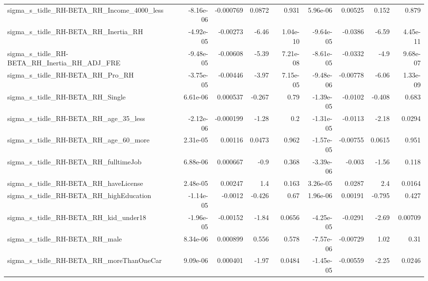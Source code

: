 \begin{tabular}{lrrrrrrrr}
sigma\_s\_tidle\_RH-BETA\_RH\_Income\_4000\_less          &   -8.16e-06 &    -0.000769 &   0.0872 &    0.931 &   5.96e-06 &     0.00525 &        0.152 &         0.879 \\
sigma\_s\_tidle\_RH-BETA\_RH\_Inertia\_RH                &   -4.92e-05 &     -0.00273 &    -6.46 & 1.04e-10 &  -9.64e-05 &     -0.0386 &        -6.59 &      4.45e-11 \\
sigma\_s\_tidle\_RH-BETA\_RH\_Inertia\_RH\_ADJ\_FRE        &   -9.48e-05 &     -0.00608 &    -5.39 & 7.21e-08 &  -8.61e-05 &     -0.0332 &         -4.9 &      9.68e-07 \\
sigma\_s\_tidle\_RH-BETA\_RH\_Pro\_RH                    &   -3.75e-05 &     -0.00446 &    -3.97 & 7.15e-05 &  -9.48e-06 &    -0.00778 &        -6.06 &      1.33e-09 \\
sigma\_s\_tidle\_RH-BETA\_RH\_Single                    &    6.61e-06 &     0.000537 &   -0.267 &     0.79 &  -1.39e-05 &     -0.0102 &       -0.408 &         0.683 \\
sigma\_s\_tidle\_RH-BETA\_RH\_age\_35\_less               &   -2.12e-06 &    -0.000199 &    -1.28 &      0.2 &  -1.31e-05 &     -0.0113 &        -2.18 &        0.0294 \\
sigma\_s\_tidle\_RH-BETA\_RH\_age\_60\_more               &    2.31e-05 &      0.00116 &   0.0473 &    0.962 &  -1.57e-05 &    -0.00755 &       0.0615 &         0.951 \\
sigma\_s\_tidle\_RH-BETA\_RH\_fulltimeJob               &    6.88e-06 &     0.000667 &     -0.9 &    0.368 &  -3.39e-06 &      -0.003 &        -1.56 &         0.118 \\
sigma\_s\_tidle\_RH-BETA\_RH\_haveLicense               &    2.48e-05 &      0.00247 &      1.4 &    0.163 &   3.26e-05 &      0.0287 &          2.4 &        0.0164 \\
sigma\_s\_tidle\_RH-BETA\_RH\_highEducation             &   -1.14e-05 &      -0.0012 &   -0.426 &     0.67 &   1.96e-06 &     0.00191 &       -0.795 &         0.427 \\
sigma\_s\_tidle\_RH-BETA\_RH\_kid\_under18               &   -1.96e-05 &     -0.00152 &    -1.84 &   0.0656 &  -4.25e-05 &     -0.0291 &        -2.69 &       0.00709 \\
sigma\_s\_tidle\_RH-BETA\_RH\_male                      &    8.34e-06 &     0.000899 &    0.556 &    0.578 &  -7.57e-06 &    -0.00729 &         1.02 &          0.31 \\
sigma\_s\_tidle\_RH-BETA\_RH\_moreThanOneCar            &    9.09e-06 &     0.000401 &    -1.97 &   0.0484 &  -1.45e-05 &    -0.00559 &        -2.25 &        0.0246 \\

\end{tabular}
